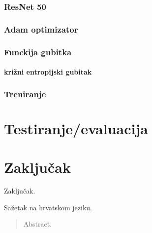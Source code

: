 \documentclass[times, utf8, zavrsni,numeric,pstricks]{fer}
\begin{document}
\subsection{ResNet 50}
\subsection{Adam optimizator}
\subsection{Funckija gubitka}
\subsubsection{križni entropijski gubitak}
\subsection{Treniranje}

\chapter{Testiranje/evaluacija}

\chapter{Zaključak}
Zaključak.




\begin{sazetak}
Sažetak na hrvatskom jeziku.

\end{sazetak}



\begin{abstract}
Abstract.

\end{abstract}
\end{document}
